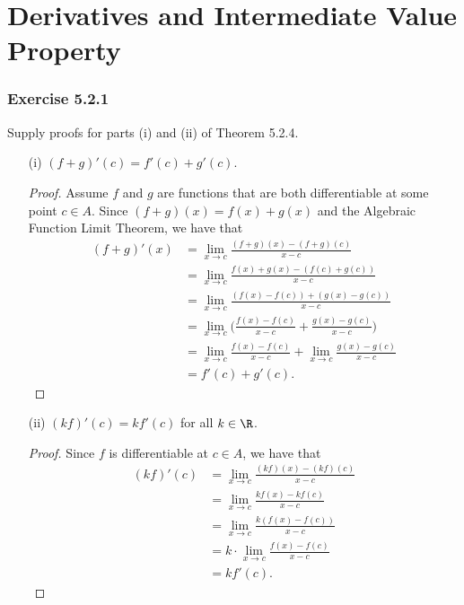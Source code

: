 \section{Derivatives and Intermediate Value Property}


\subsubsection{Exercise 5.2.1} Supply proofs for parts (i) and (ii) of Theorem 5.2.4.
\begin{enumerate}
    \item[(i)] \( (f+g)'(c) = f'(c) + g'(c)  \).
        \begin{proof}
        Assume \( f  \) and \( g  \) are functions that are both differentiable at some point \( c \in A  \). Since \( (f+g)(x) = f(x) + g(x)  \) and the Algebraic Function Limit Theorem, we have that
        \begin{align*}
            (f+g)'(x) &= \lim_{ x \to c } \frac{ (f+g)(x) - (f+g)(c) }{ x - c  }  \\
                      &= \lim_{ x \to c } \frac{ f(x) + g(x) - (f(c) + g(c) ) }{ x - c  } \\
                      &= \lim_{ x \to c  } \frac{ ( f(x) - f(c)) + (g(x) - g(c)) }{ x - c  } \\
                      &= \lim_{ x \to c  } \Big(  \frac{ f(x) - f(c)  }{ x - c  } + \frac{ g(x) - g(c)   }{ x - c  }  \Big) \\
                      &= \lim_{ x \to c  }  \frac{ f(x) - f(c)  }{ x - c  } + \lim_{ x \to c  } \frac{ g(x) - g(c)  }{ x - c  } \\
                      &= f'(c) + g'(c).
        \end{align*}
        \end{proof}
    \item[(ii)] \( (kf)'(c) = k f'(c)  \) for all \( k \in \R  \).
        \begin{proof}
        Since \( f  \) is differentiable at \( c \in A  \), we have that 
        \begin{align*}
            (kf)'(c) &= \lim_{ x \to c  } \frac{ (kf)(x) - (kf)(c)  }{ x - c  }  \\
                     &= \lim_{ x \to c  }  \frac{ k f(x) - k f(c)  }{ x - c  } \\
                     &= \lim_{ x \to c  } \frac{ k (f(x) - f(c) ) }{ x - c  } \\
                     &=k \cdot  \lim_{ x \to c  } \frac{ f(x) - f(c) }{ x - c  } \\
                     &= k f'(c).
        \end{align*}
        \end{proof}
\end{enumerate}

